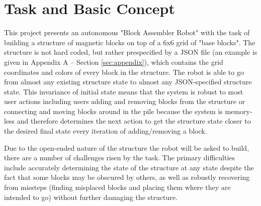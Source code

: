 \section{Task and Basic Concept}

\noindent This project presents an autonomous "Block Assembler Robot" with the task of building a structure of magnetic blocks on top of a 6x6 grid of "base blocks". The structure is not hard coded, but rather prespecified by a JSON file (an example is given in Appendix A -- Section \ref{sec:appendix}), which contains the grid coordinates and colors of every block in the structure. The robot is able to go from almost any existing structure state to almost any JSON-specified structure state. This invariance of initial state means that the system is robust to most user actions including users adding and removing blocks from the structure or connecting and moving blocks around in the pile because the system is memory-less and therefore determines the next action to get the structure state closer to the desired final state every iteration of adding/removing a block.

\noindent Due to the open-ended nature of the structure the robot will be asked to build, there are a number of challenges risen by the task. The primary difficulties include accurately determining the state of the structure at any state despite the fact that some blocks may be obscured by others, as well as robustly recovering from missteps (finding misplaced blocks and placing them where they are intended to go) without further damaging the structure. 
